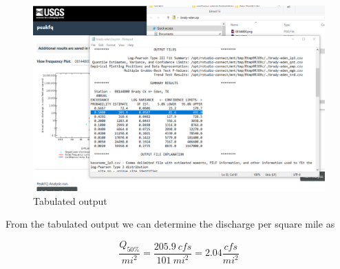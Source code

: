 \documentclass[12pt]{article}
\begin{document}
\begin{enumerate}
\begin{figure}[h!] %
   \centering
   \includegraphics[width=7in]{output-table.png} 
   \caption{Tabulated output}
   \label{fig:output-table}
\end{figure}

\clearpage

From the tabulated output we can determine the discharge per square mile as

\begin{equation}
\frac{Q_{50\%}}{mi^2} = \frac{205.9~cfs}{101~mi^2} = 2.04 \frac{cfs}{mi^2}
\end{equation}

\end{enumerate}
\end{document}
